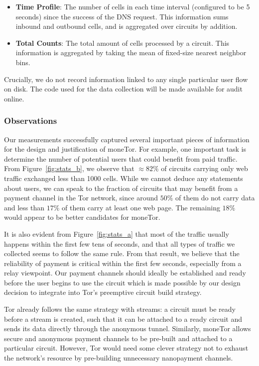 \begin{itemize}
\item \textbf{Time Profile}: The number of cells in each time interval
  (configured to be 5 seconds) since the success of the DNS request. This
  information sums inbound and outbound cells, and is aggregated over circuits
  by addition.
\item \textbf{Total Counts}: The total amount of cells processed by a
  circuit. This information is aggregated by taking the mean of fixed-size
  nearest neighbor bins.
\end{itemize}

Crucially, we do not record information linked to any single particular user
flow on disk. The code used for the data collection will be made available for
audit online.

\subsubsection{Observations}

Our measurements successfully captured several important pieces of information
for the design and justification of moneTor. For example, one important task is
determine the number of potential users that could benefit from paid
traffic. From Figure~\ref{fig:stats_b}, we observe that $\approx 82\%$ of
circuits carrying only web traffic exchanged less than 1000 cells. While we
cannot deduce any statements about users, we can speak to the fraction of
circuits that may benefit from a payment channel in the Tor network, since
around $50\%$ of them do not carry data and less than $17\%$ of them carry at
least one web page. The remaining $18\%$ would appear to be better candidates
for moneTor.

It is also evident from Figure~\ref{fig:stats_a} that most of the traffic
usually happens within the first few tens of seconds, and that all types of
traffic we collected seems to follow the same rule. From that result, we believe
that the reliability of payment is critical within the first few seconds,
especially from a relay viewpoint. Our payment channels should ideally be
established and ready before the user begins to use the circuit which is made
possible by our design decision to integrate into Tor's preemptive circuit build
strategy.

Tor already follows the
same strategy with streams: a circuit must be ready before a stream is created,
such that it can be attached to a ready circuit and sends its data directly
through the anonymous tunnel. Similarly, moneTor allows secure and anonymous
payment channels to be pre-built and attached to a particular circuit. However,
Tor would need some clever strategy not to exhaust the network's resource by
pre-building unnecessary nanopayment channels.


